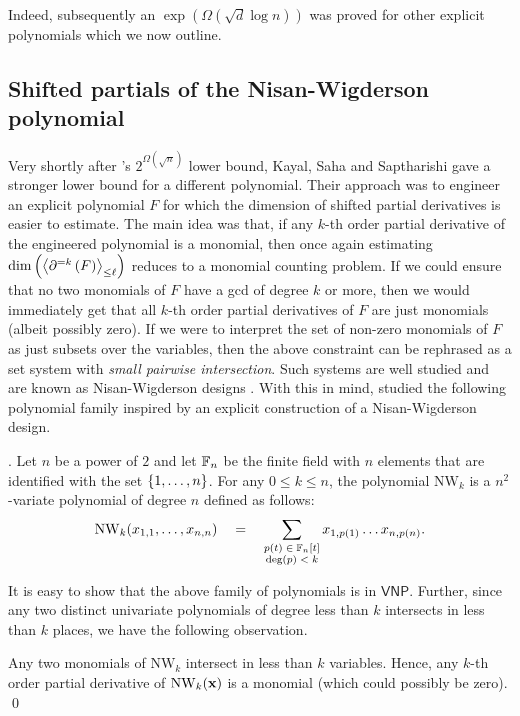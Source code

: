 Indeed, subsequently an $\exp(\Omega(\sqrt{d}\log n))$ was proved \cite{KSS13,FLMS13} for other explicit polynomials  which we now outline. 

\subsection{Shifted partials of the Nisan-Wigderson polynomial}

Very shortly after \cite{gkks13}'s $2^{\Omega(\sqrt{n})}$ lower bound, Kayal, Saha and Saptharishi \cite{KSS13} gave a stronger lower bound for a different polynomial. 
Their approach was to engineer an explicit polynomial $F$ for which the dimension of shifted partial derivatives is easier to estimate. 
The main idea was that, if any $k$-th order partial derivative of the engineered polynomial is a monomial, then once again estimating $\dim\left(\left\langle\partial^{=k}\left(F\right)\right\rangle_{\leq \ell}\right)$ reduces to a monomial counting problem. 
If we could ensure that no two monomials of $F$ have a gcd of degree $k$ or more, then we would immediately get that all $k$-th order partial derivatives of $F$ are just monomials (albeit possibly zero). 
If we were to interpret the set of non-zero monomials of $F$ as just subsets over the variables, then the above constraint can be rephrased as a set system with \emph{small pairwise intersection}. 
Such systems are well studied and are known as Nisan-Wigderson designs \cite{nw94}. 
With this in mind, \cite{KSS13} studied the following polynomial family inspired by an explicit construction of a Nisan-Wigderson design. 

\begin{definition}. 
Let $n$ be a power of $2$ and let $\mathbb{F}_n$ be the finite field with $n$ elements that are identified with the set $\left\{1,\dots, n\right\}$. 
For any $0\leq k \leq n$, the polynomial $\mathrm{NW}_k$ is a $n^2$-variate polynomial of degree $n$ defined as follows:
$$
\mathrm{NW}_k(x_{1,1},\dots, x_{n,n}) \quad = \quad \sum_{\substack{p(t) \;\in\; \mathbb{F}_n[t]\\\deg(p) \;<\; k}} x_{1,p(1)}\dots x_{n,p(n)}.
$$
\end{definition}

It is easy to show that the above family of polynomials is in $\mathsf{VNP}$. 
Further, since any two distinct univariate polynomials of degree less than $k$ intersects in less than $k$ places, we have the following observation. 

\begin{observation}
Any two monomials of $\mathrm{NW}_k$ intersect in less than $k$ variables. 
Hence, any $k$-th order partial derivative of $\mathrm{NW}_k(\mathbf{x})$ is a monomial (which could possibly be zero). \qed
\end{observation}

